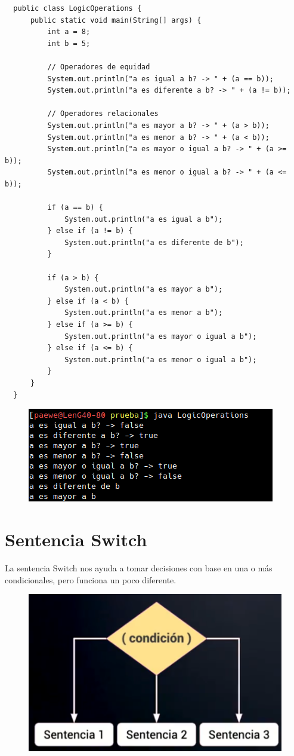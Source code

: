 \documentclass{article}
\begin{document}
\begin{verbatim}
  public class LogicOperations {
      public static void main(String[] args) {
          int a = 8;
          int b = 5;

          // Operadores de equidad
          System.out.println("a es igual a b? -> " + (a == b));
          System.out.println("a es diferente a b? -> " + (a != b));

          // Operadores relacionales
          System.out.println("a es mayor a b? -> " + (a > b));
          System.out.println("a es menor a b? -> " + (a < b));
          System.out.println("a es mayor o igual a b? -> " + (a >= b));
          System.out.println("a es menor o igual a b? -> " + (a <= b));

          if (a == b) {
              System.out.println("a es igual a b");
          } else if (a != b) {
              System.out.println("a es diferente de b");
          }

          if (a > b) {
              System.out.println("a es mayor a b");
          } else if (a < b) {
              System.out.println("a es menor a b");
          } else if (a >= b) {
              System.out.println("a es mayor o igual a b");
          } else if (a <= b) {
              System.out.println("a es menor o igual a b");
          }
      }
  }
\end{verbatim}

\begin{figure}[h!]
  \centering
  \includegraphics[scale=0.75]{./Pictures/047_logic.png}
\end{figure}


\section{Sentencia Switch}%
La sentencia Switch nos ayuda a tomar decisiones con base en una o más
condicionales, pero funciona un poco diferente.

\begin{figure}[h!]
  \centering
  \includegraphics[scale=0.75]{./Pictures/023_switch.png}
\end{figure}
\end{document}
